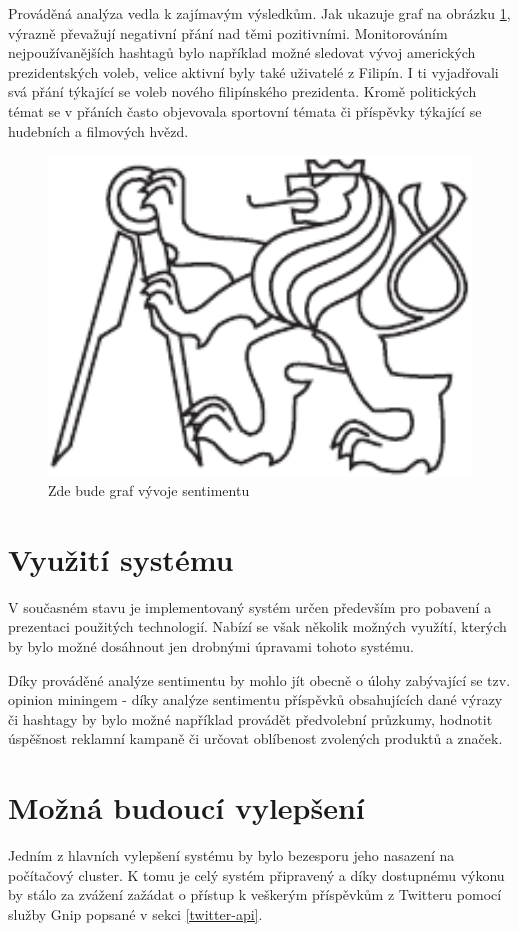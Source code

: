 \documentclass[thesis=B,czech]{FITthesis}[2012/06/26]
\begin{document}
Prováděná analýza vedla k zajímavým výsledkům. Jak ukazuje graf na obrázku \ref{fig:sentiment-graph}, výrazně převažují negativní přání nad těmi pozitivními. Monitorováním nejpoužívanějších hashtagů bylo například možné sledovat vývoj amerických prezidentských voleb, velice aktivní byly také uživatelé z Filipín. I ti vyjadřovali svá přání týkající se voleb nového filipínského prezidenta. Kromě politických témat se v přáních často objevovala sportovní témata či příspěvky týkající se hudebních a filmových hvězd. 
\begin{figure}[h]
   	\centering
   	\includegraphics[width=1\textwidth]{images/cvut-logo-bw.pdf}
   	\caption{Zde bude graf vývoje sentimentu}
   	\label{fig:sentiment-graph}
\end{figure}

\section{Využití systému}
V současném stavu je implementovaný systém určen především pro pobavení a prezentaci použitých technologií. Nabízí se však několik možných využítí, kterých by bylo možné dosáhnout jen drobnými úpravami tohoto systému. 

Díky prováděné analýze sentimentu by mohlo jít obecně o úlohy zabývající se tzv. opinion miningem - díky analýze sentimentu příspěvků obsahujících dané výrazy či hashtagy by bylo možné například provádět předvolební průzkumy, hodnotit úspěšnost reklamní kampaně či určovat oblíbenost zvolených produktů a značek. 


\section{Možná budoucí vylepšení}
Jedním z hlavních vylepšení systému by bylo bezesporu jeho nasazení na počítačový cluster. K tomu je celý systém připravený a díky dostupnému výkonu by stálo za zvážení zažádat o přístup k veškerým příspěvkům z Twitteru pomocí služby Gnip popsané v sekci \ref{twitter-api}. 
\end{document}

